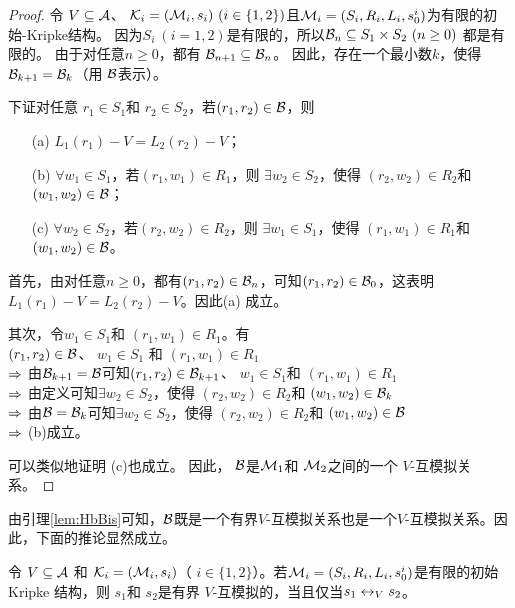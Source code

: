 \begin{proof}
	令 $V \subseteq {\cal A}$、 ${\cal K}_i=({\cal M}_i,s_i)~(i\in\{1,2\})$且${\cal M}_i=(S_i, R_i,L_i, s_0^i)$为有限的初始-Kripke结构。
	因为$S_i~(i=1,2)$是有限的，所以${\cal B}_n\subseteq S_1\times S_2~(n\ge 0)$ 都是有限的。
	由于对任意$n\geq 0$，都有 ${\cal B}_{n+1} \subseteq {\cal B}_n$。
	因此，存在一个最小数$k$，使得
	${\cal B}_{k+1} ={\cal B}_k$（用 ${\cal B}$表示）。
	
	
	下证对任意 $r_1\in S_1$和 $r_2 \in S_2$，若$(r_1, r_2)\in {\cal B}$，则 %
	\begin{itemize}
		\item[(a)] $L_1(r_1)-V = L_2(r_2)-V$；
		\item[(b)] $\forall w_1\in S_1$，若$(r_1, w_1)\in R_1$，则 $\exists w_2 \in S_2$，使得 $(r_2,w_2) \in R_2$和 $(w_1, w_2) \in {\cal B}$；
		\item[(c)] $\forall w_2\in S_2$，若$(r_2, w_2)\in R_2$，则 $\exists w_1 \in S_1$，使得 $(r_1,w_1) \in R_1$和 $(w_1, w_2)\in {\cal B} $。
	\end{itemize}
	
	首先，由对任意$n\ge 0$，都有$(r_1, r_2)\in {\cal B}_n$，可知$(r_1, r_2) \in {\cal B}_0$，这表明
	$L_1(r_1)-V = L_2(r_2)-V$。因此(a) 成立。
	
	其次，令$w_1 \in S_1$和 $(r_1, w_1)\in R_1$。有 \\
	$(r_1,r_2)\in {\cal B}$、 $w_1 \in S_1$ 和 $(r_1, w_1)\in R_1$\\
	$\Rightarrow$ 由${\cal B}_{k+1}={\cal B}$可知$(r_1,r_2)\in {\cal B}_{k+1}$、 $w_1 \in S_1$和 $(r_1, w_1)\in R_1$\\
	$\Rightarrow$ 由定义可知$\exists w_2\in S_2$，使得 $(r_2, w_2)\in R_2$和 $(w_1,w_2)\in {\cal B}_k$\\
	$\Rightarrow$ 由${\cal B}={\cal B}_k$可知$\exists w_2\in S_2$，使得 $(r_2, w_2)\in R_2$和 $(w_1,w_2)\in {\cal B}$\\
	$\Rightarrow$ (b)成立。
	
	可以类似地证明 (c)也成立。
	因此， ${\cal B}$是${\cal M}_1$和 ${\cal M}_2$之间的一个 $V$-互模拟关系。
\end{proof}

由引理\ref{lem:HbBis}可知，${\cal B}$既是一个有界$V$-互模拟关系也是一个$V$-互模拟关系。因此，下面的推论显然成立。
\begin{corollary} \label{lem:bounedToGe}
	令 $V \subseteq {\cal A}$ 和 ${\cal K}_i=({\cal M}_i,s_i)$（ $i\in\{1,2\}$）。若${\cal M}_i=(S_i, R_i,L_i, s_0^i)$是有限的初始Kripke 结构，则
	$s_1$和 $s_2$是有界 $V$-互模拟的，当且仅当$s_1 \leftrightarrow_V s_2$。
\end{corollary}


